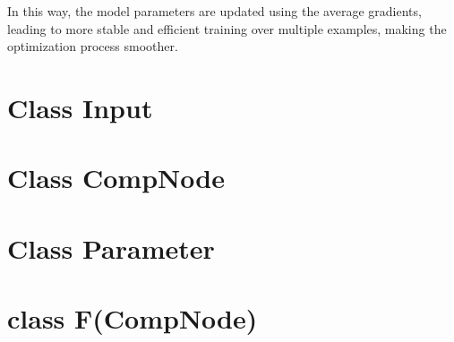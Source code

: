 \documentclass{article}
\begin{document}
In this way, the model parameters are updated using the average gradients, leading to more stable and efficient training over multiple examples, making the optimization process smoother.

\section{Class Input}

\section{Class CompNode}

\section{Class Parameter}

\section{class F(CompNode)}
\end{document}
